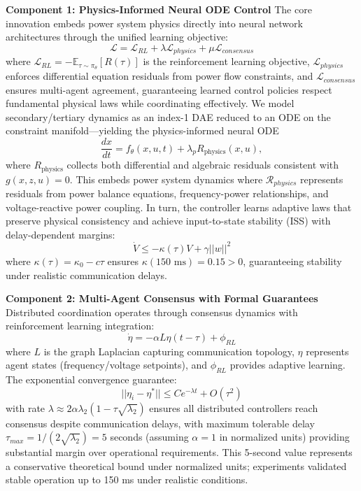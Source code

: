 \documentclass[12pt]{article}
\begin{document}
\textbf{Component 1: Physics-Informed Neural ODE Control}
The core innovation embeds power system physics directly into neural network architectures through the unified learning objective:
$$\mathcal{L} = \mathcal{L}_{RL} + \lambda \mathcal{L}_{physics} + \mu \mathcal{L}_{consensus}$$
where $\mathcal{L}_{RL} = -\mathbb{E}_{\tau \sim \pi_\theta}[R(\tau)]$ is the reinforcement learning objective, $\mathcal{L}_{physics}$ enforces differential equation residuals from power flow constraints, and $\mathcal{L}_{consensus}$ ensures multi-agent agreement, guaranteeing learned control policies respect fundamental physical laws while coordinating effectively. We model secondary/tertiary dynamics as an index-1 DAE reduced to an ODE on the constraint manifold—yielding the physics-informed neural ODE
\begin{equation}
\frac{dx}{dt}=f_\theta(x,u,t)+\lambda_p R_{\text{physics}}(x,u),
\end{equation}
where $R_{\text{physics}}$ collects both differential and algebraic residuals consistent with $g(x,z,u)=0$. This embeds power system dynamics where $\mathcal{R}_{physics}$ represents residuals from power balance equations, frequency-power relationships, and voltage-reactive power coupling. In turn, the controller learns adaptive laws that preserve physical consistency and achieve input-to-state stability (ISS) with delay-dependent margins:
$$\dot{V} \leq -\kappa(\tau)V + \gamma||w||^2$$
where $\kappa(\tau) = \kappa_0 - c\tau$ ensures $\kappa(150\text{ ms}) = 0.15 > 0$, guaranteeing stability under realistic communication delays.

\textbf{Component 2: Multi-Agent Consensus with Formal Guarantees}
Distributed coordination operates through consensus dynamics with reinforcement learning integration:
$$\dot{\eta} = -\alpha L \eta(t-\tau) + \phi_{RL}$$
where $L$ is the graph Laplacian capturing communication topology, $\eta$ represents agent states (frequency/voltage setpoints), and $\phi_{RL}$ provides adaptive learning. The exponential convergence guarantee:
$$||\eta_i - \eta^*|| \leq Ce^{-\lambda t} + O(\tau^2)$$
with rate $\lambda \approx 2\alpha\lambda_2(1 - \tau\sqrt{\lambda_2})$ ensures all distributed controllers reach consensus despite communication delays, with maximum tolerable delay $\tau_{max} = 1/(2\sqrt{\lambda_2}) = 5$ seconds (assuming $\alpha = 1$ in normalized units) providing substantial margin over operational requirements. This 5-second value represents a conservative theoretical bound under normalized units; experiments validated stable operation up to 150 ms under realistic conditions.
\end{document}
